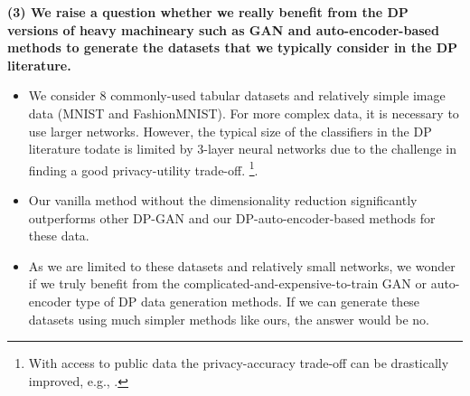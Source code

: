 \documentclass{article}
\begin{document}
\textbf{(3) We raise a question whether we really benefit from the DP versions of heavy machineary such as GAN and auto-encoder-based methods to generate the datasets that we typically consider in the DP literature.}
\begin{itemize}
    \item We consider $8$ commonly-used  tabular datasets and relatively simple image data (MNIST and FashionMNIST). For more complex data, it is necessary to use larger networks. However,   
    the typical size of the classifiers in the DP literature todate is limited by 3-layer neural networks due to the challenge in finding a good privacy-utility trade-off.  \footnote{With access to public data the privacy-accuracy trade-off can be drastically improved, e.g.,  \cite{papernot:private-training}.}.
    \item Our vanilla method without the dimensionality reduction significantly outperforms other DP-GAN and our DP-auto-encoder-based methods for these data.
    \item  As we are limited to these datasets and relatively small networks, we wonder if we truly benefit from the complicated-and-expensive-to-train GAN or auto-encoder type of DP data generation methods. If we can generate these datasets using much simpler methods like ours, the answer would be no. 
\end{itemize}
    
    
  

         
\end{document}
